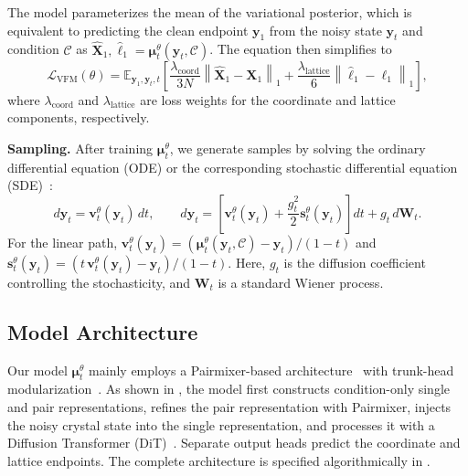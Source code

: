 The model parameterizes the mean of the variational posterior,
which is equivalent to predicting the clean endpoint $\mathbf{y}_1$ from the noisy
state $\mathbf{y}_t$ and condition $\mathcal{C}$ as
$\widehat{\mathbf{X}}_1,\widehat{\boldsymbol{\ell}}_1
=\boldsymbol{\mu}_t^{\theta}\!\left(\mathbf{y}_t,\mathcal{C}\right)$.
The equation then simplifies to
\begin{equation}
\label{eq:method-vfm-loss}
\mathcal{L}_{\mathrm{VFM}}(\theta)
=\mathbb{E}_{\mathbf{y}_1,\mathbf{y}_t,t}\!\left[
\frac{\lambda_{\mathrm{coord}}}{3N}
\left\|\widehat{\mathbf{X}}_1-\mathbf{X}_1\right\|_1
+
\frac{\lambda_{\mathrm{lattice}}}{6}
\left\|\widehat{\boldsymbol{\ell}}_1-
\boldsymbol{\ell}_1\right\|_1
\right],
\end{equation}
where $\lambda_{\mathrm{coord}}$ and $\lambda_{\mathrm{lattice}}$ are loss weights
for the coordinate and lattice components, respectively.

\textbf{Sampling.}
After training $\boldsymbol{\mu}_t^\theta$, we generate samples by solving the ordinary differential equation (ODE) or the corresponding stochastic differential equation (SDE)~\citep{eijkelboom2024variational,albergo2025stochastic}:
\begin{equation}
d\mathbf{y}_t
=\mathbf{v}_t^\theta(\mathbf{y}_t)\,dt,
\qquad
d\mathbf{y}_t
=
\left[
\mathbf{v}_t^\theta(\mathbf{y}_t)
+\frac{g_t^2}{2}\mathbf{s}_t^\theta(\mathbf{y}_t)
\right]dt
+g_t\,d\mathbf{W}_t.
\end{equation}
For the linear path,
$\mathbf{v}_t^\theta(\mathbf{y}_t)
=(\boldsymbol{\mu}_t^\theta(\mathbf{y}_t,\mathcal C)-\mathbf{y}_t)/(1-t)$
and
$\mathbf{s}_t^\theta(\mathbf{y}_t)
=(t\,\mathbf{v}_t^\theta(\mathbf{y}_t)-\mathbf{y}_t)/(1-t)$.
Here, $g_t$ is the diffusion coefficient controlling the stochasticity, and
$\mathbf{W}_t$ is a standard Wiener process.

\subsection{Model Architecture}
\label{sec:method-architecture}

Our model $\boldsymbol{\mu}_t^{\theta}$ mainly employs a Pairmixer-based
architecture~\citep{ouyangzhang2025triangle} with trunk-head modularization~\citep{Abramson2024, bytedance2025protenix}. As shown in
, the model first constructs condition-only
single and pair representations, refines the pair representation with Pairmixer,
injects the noisy crystal state into the single representation, and processes it
with a Diffusion Transformer (DiT)~\citep{peebles2023scalable}. Separate output heads predict the coordinate and lattice endpoints. The complete architecture is specified
algorithmically in .

